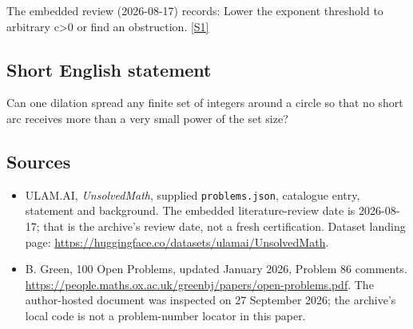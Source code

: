\documentclass[11pt,a4paper]{article}
\newcommand{\sref}[2]{\hyperlink{source:#1:#2}{[S#2]}}
\begin{document}
The embedded review (2026-08-17) records: Lower the exponent threshold to arbitrary c>0 or find an obstruction. \sref{statement}{1}

\subsection{Short English statement}

Can one dilation spread any finite set of integers around a circle so that no short arc receives more than a very small power of the set size?

\subsection{Sources}

{\small

\begin{itemize}

\item[\hypertarget{source:statement:1}{S1}] ULAM.AI, \emph{UnsolvedMath}, supplied \texttt{problems.json}, catalogue entry, statement and background. The embedded literature-review date is 2026-08-17; that is the archive’s review date, not a fresh certification. Dataset landing page: \url{https://huggingface.co/datasets/ulamai/UnsolvedMath}.

\item[\hypertarget{source:statement:2}{S2}] B. Green, 100 Open Problems, updated January 2026, Problem 86 comments. \url{https://people.maths.ox.ac.uk/greenbj/papers/open-problems.pdf}. The author-hosted document was inspected on 27 September 2026; the archive’s local code is not a problem-number locator in this paper.

\end{itemize}

}

\label{end:statement}
\end{document}
